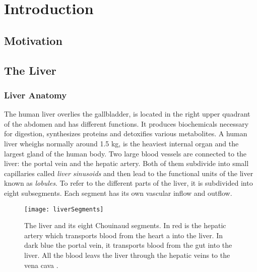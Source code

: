 %
%
%

\chapter{Introduction}
\section{Motivation} 
\section{The Liver} 
\subsection{Liver Anatomy}
The human liver overlies the gallbladder, is located in the right upper quadrant of the abdomen and has
different functions. It produces biochemicals necessary for digestion,
synthesizes proteins and detoxifies various metabolites. A human liver wheighs
normally around 1.5 kg, is the heaviest internal organ and the largest gland
of the human body. Two large blood vessels are connected to the liver: the
portal vein and the hepatic artery. Both of them subdivide into small
capillaries called \textit{liver sinusoids} and then lead to the functional
units of the liver known as \textit{lobules}. To refer to the different parts of
the liver, it is subdivided into eight subsegments. Each segment has its own
vascular inflow and outflow.
\begin{figure}[H]
  \centering
 \texttt{[image: liverSegments]}
  \caption{The liver and its eight Chouinaud segments. In red is the hepatic
    artery which transports blood from the heart a into the liver. In dark blue
    the portal vein, it transports blood from the gut into the liver. All the
    blood leavs the liver through the hepatic veins to the vena cava \cite{siriwardena2014management}.}
  \label{fig:liverSegments}
\end{figure}

